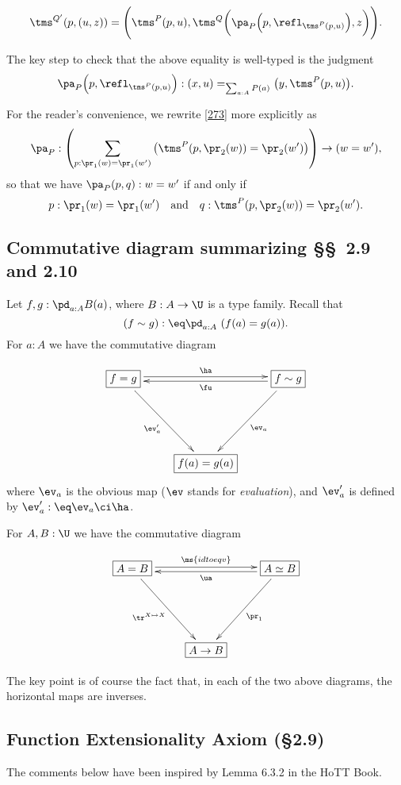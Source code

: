 \documentclass[12pt]{article}
\begin{document}
\begin{equation}\label{ld}
\tms^{Q'}(p,(u,z))=\Bigg(\tms^P(p,u),\tms^Q\bigg(\pa_P\Big(p,\refl_{\tms^P(p,u)}\Big),z\bigg)\Bigg).
\end{equation}

The key step to check that the above equality is well-typed is the judgment 
$$
\pa_P\Big(p,\refl_{\tms^P(p,u)}\Big):(x,u)=_{\sum_{a:A}P(a)}\big(y,\tms^P(p,u)\big).
$$ 

For the reader's convenience, we rewrite \eqref{273} more explicitly as 
$$
\pa_P:\left(\sum_{p:\pr_1(w)=\pr_1(w')}\big(\tms^P(p,\pr_2(w))=\pr_2(w')\big)\right)\to(w=w'),
$$ 
so that we have $\pa_P(p,q):w=w'$ if and only if 
$$
p:\pr_1(w)=\pr_1(w')\quad\text{and}\quad q:\tms^P(p,\pr_2(w))=\pr_2(w').
$$


\subsection{Commutative diagram summarizing \S\S\ 2.9 and 2.10}\label{209210}

Let $f,g:\pd_{a:A}B(a)$, where $B:A\to\U$ is a type family. Recall that 
$$
(f\sim g):\eq\pd_{a:A}\ (f(a)=g(a)).
$$ 
For $a:A$ we have the commutative diagram

$$
\xymatrix{
\boxed{f=g}\ar[ddr]_{\ev'_a}\ar@<2pt>[rr]^\ha&&\boxed{f\sim g}\ar[ddl]^{\ev_a}\ar@<2pt>[ll]^\fu\\ \\
&\boxed{f(a)=g(a)}}
$$ 
where $\ev_a$ is the obvious map ($\ev$ stands for \emph{evaluation}), and $\ev'_a$ is defined by $\ev'_a:\eq\ev_a\ci\ha$.

For $A,B:\U$ we have the commutative diagram

$$
\xymatrix{
\boxed{A=B}\ar[ddr]_{\tr^{X\mapsto X}}\ar@<2pt>[rr]^{\ms{idtoeqv}}&&\boxed{A\simeq B}\ar[ddl]^{\pr_1}\ar@<2pt>[ll]^\ua\\ \\
&\boxed{A\to B}}
$$

The key point is of course the fact that, in each of the two above diagrams, the horizontal maps are inverses.


\subsection{Function Extensionality Axiom (\S2.9)}

The comments below have been inspired by Lemma 6.3.2 in the HoTT Book. 
\end{document}
